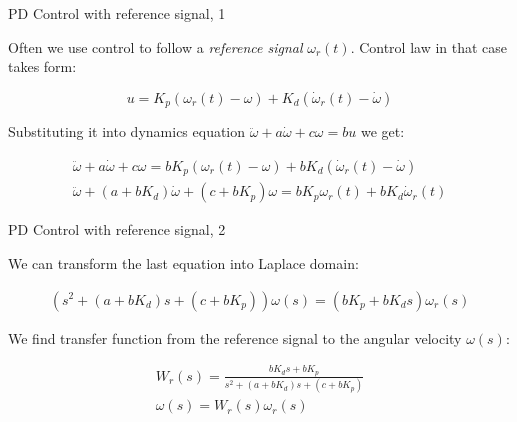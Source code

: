 \documentclass{beamer}
\begin{document}
\begin{frame}{PD Control with reference signal, 1}
	\begin{flushleft}
		
		Often we use control to follow a \emph{reference signal} $\omega_r(t)$. Control law in that case takes form:
		
		\begin{equation}
			u = K_p (\omega_r(t) - \omega) + K_d (\dot \omega_r(t) - \dot \omega)
		\end{equation}
		
		Substituting it into dynamics equation $\ddot \omega  + a\dot \omega  + c\omega =
		b u $ we get:
		
		\begin{align}
			\ddot \omega  + a\dot \omega  + c\omega =
			b K_p (\omega_r(t) - \omega) + b K_d (\dot \omega_r(t) - \dot \omega)
			\\
			\ddot \omega  + (a + b K_d )\dot \omega  + (c + b K_p)\omega =
			b K_p \omega_r(t) + b K_d \dot \omega_r(t)
		\end{align}
		
		
	\end{flushleft}
\end{frame}


\begin{frame}{PD Control with reference signal, 2}
	\begin{flushleft}
		
		We can transform the last equation into Laplace domain:
		
		\begin{align}
			(s^2  + (a + b K_d ) s  + (c + b K_p))\omega(s) =
			(b K_p + b K_d s) \omega_r(s)
		\end{align}
	
		We find transfer function from the reference signal to the angular velocity $\omega(s)$:
		
		\begin{align}
			W_r(s) = \frac{b K_d s + b K_p}{s^2  + (a + b K_d ) s  + (c + b K_p)} \\
			\omega(s) = W_r(s) \omega_r(s)
		\end{align}
		
	\end{flushleft}
\end{frame}
\end{document}
